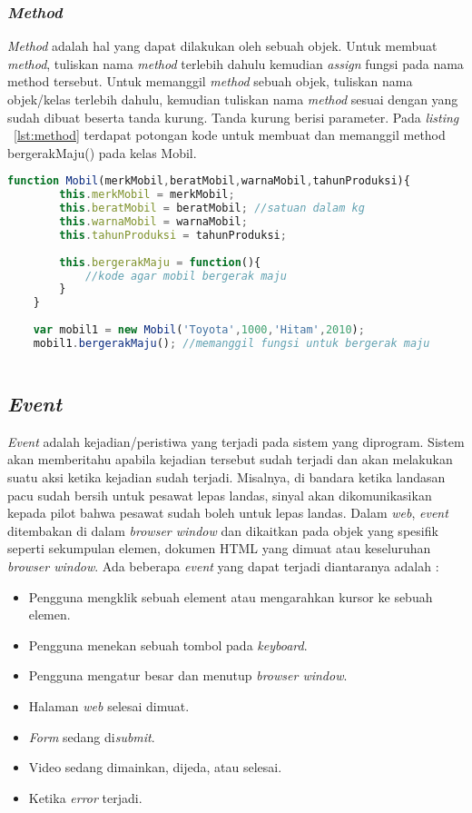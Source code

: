 \subsubsection{\textit{Method}}
\textit{Method} adalah hal yang dapat dilakukan oleh sebuah objek. Untuk membuat \textit{method}, tuliskan nama \textit{method} terlebih dahulu kemudian \textit{assign} fungsi pada nama method tersebut. Untuk memanggil \textit{method} sebuah objek, tuliskan nama objek/kelas terlebih dahulu, kemudian tuliskan nama \textit{method} sesuai dengan yang sudah dibuat beserta tanda kurung. Tanda kurung berisi parameter. Pada \textit{listing} ~\ref{lst:method} terdapat potongan kode untuk membuat dan memanggil method bergerakMaju() pada kelas Mobil.

\begin{lstlisting}[language=Javascript, caption=Membuat dan memanggil method bergerakMaju(), label={lst:method}]
	function Mobil(merkMobil,beratMobil,warnaMobil,tahunProduksi){
		this.merkMobil = merkMobil;
		this.beratMobil = beratMobil; //satuan dalam kg
		this.warnaMobil = warnaMobil;
		this.tahunProduksi = tahunProduksi;
		
		this.bergerakMaju = function(){
			//kode agar mobil bergerak maju
		}
	}
	
	var mobil1 = new Mobil('Toyota',1000,'Hitam',2010);
	mobil1.bergerakMaju(); //memanggil fungsi untuk bergerak maju
	
\end{lstlisting}

\subsection{\textit{Event}}
\textit{Event} adalah kejadian/peristiwa yang terjadi pada sistem yang diprogram. Sistem akan memberitahu apabila kejadian tersebut sudah terjadi dan akan melakukan suatu aksi ketika kejadian sudah terjadi. Misalnya, di bandara ketika landasan pacu sudah bersih untuk pesawat lepas landas, sinyal akan dikomunikasikan kepada pilot bahwa pesawat sudah boleh untuk lepas landas. Dalam \textit{web}, \textit{event} ditembakan di dalam \textit{browser window} dan dikaitkan pada objek yang spesifik seperti sekumpulan elemen, dokumen HTML yang dimuat atau keseluruhan \textit{browser window}. Ada beberapa \textit{event} yang dapat terjadi diantaranya adalah : 

\begin{itemize}
	\item Pengguna mengklik sebuah element atau mengarahkan kursor ke sebuah elemen.
	\item Pengguna menekan sebuah tombol pada \textit{keyboard}.
	\item Pengguna mengatur besar dan menutup \textit{browser window}.
	\item Halaman \textit{web} selesai dimuat.
	\item \textit{Form} sedang di\textit{submit}.
	\item Video sedang dimainkan, dijeda, atau selesai.
	\item Ketika \textit{error} terjadi.
\end{itemize}

